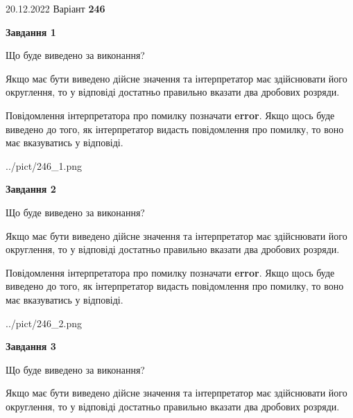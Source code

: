 \documentclass[12pt, ukrainian]{article}
\begin{document}
{20.12.2022 Варіант \No \textbf { 246 }\par}
{
\begin {Large}

{\begin {center}\textbf{Завдання 1}\end {center}}\par
Що буде виведено за виконання? \par

Якщо має бути виведено дійсне значення та інтерпретатор має здійснювати його округлення, 
то у відповіді достатньо правильно вказати два дробових розряди.

Повідомлення інтерпретатора про помилку позначати \textbf{error}.
Якщо щось буде виведено до того, як інтерпретатор видасть повідомлення про помилку, 
то воно має вказуватись у відповіді. \par

\begin{center}
	{../pict/246_1.png}
\end{center}
\newpage

{\begin {center}\textbf{Завдання 2}\end {center}}\par
Що буде виведено за виконання? \par

Якщо має бути виведено дійсне значення та інтерпретатор має здійснювати його округлення, 
то у відповіді достатньо правильно вказати два дробових розряди.

Повідомлення інтерпретатора про помилку позначати \textbf{error}.
Якщо щось буде виведено до того, як інтерпретатор видасть повідомлення про помилку, 
то воно має вказуватись у відповіді. \par

\begin{center}
	{../pict/246_2.png}
\end{center}
\newpage

{\begin {center}\textbf{Завдання 3}\end {center}}\par
Що буде виведено за виконання? \par

Якщо має бути виведено дійсне значення та інтерпретатор має здійснювати його округлення, 
то у відповіді достатньо правильно вказати два дробових розряди.


\end{Large}}
\end{document}

